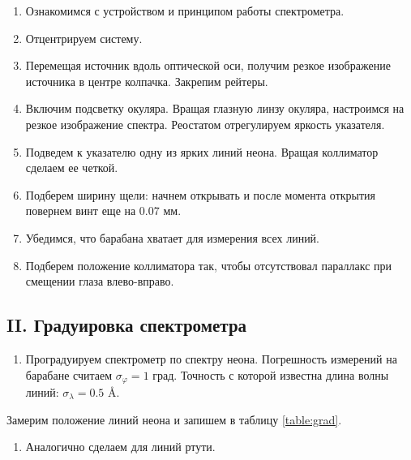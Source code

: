\documentclass[a4paper,12pt]{article}
\begin{document}
\begin{enumerate}
    \item Ознакомимся с устройством и принципом работы спектрометра.
    \item Отцентрируем систему.
    \item Перемещая источник вдоль оптической оси, получим резкое изображение источника в центре колпачка. Закрепим рейтеры.
    \item Включим подсветку окуляра. Вращая глазную линзу окуляра, настроимся на резкое изображение спектра. Реостатом отрегулируем яркость указателя.
    \item Подведем к указателю одну из ярких линий неона. Вращая коллиматор сделаем ее четкой.
    \item Подберем ширину щели: начнем открывать и после момента открытия повернем винт еще на 0.07 мм.
    \item Убедимся, что барабана хватает для измерения всех линий.
    \item Подберем положение коллиматора так, чтобы отсутствовал параллакс при смещении глаза влево-вправо.
\end{enumerate}


\subsection*{II. Градуировка спектрометра}

\begin{enumerate}
    \item Проградуируем спектрометр по спектру неона. Погрешность измерений на барабане считаем $\sigma_\varphi = 1$ град. Точность с которой известна длина волны линий: $\sigma_\lambda = 0.5$ \AA.
\end{enumerate}

Замерим положение линий неона и запишем в таблицу \ref{table:grad}.

\begin{enumerate}[resume]
    \item Аналогично сделаем для линий ртути.
\end{enumerate}
\end{document}
